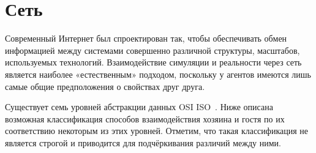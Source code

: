 \section{Сеть}

Современный Интернет был спроектирован так, чтобы обеспечивать обмен информацией между системами совершенно различной структуры, масштабов, используемых технологий. Взаимодействие симуляции и реальности через сеть является наиболее «естественным» подходом, поскольку у агентов имеются лишь самые общие предположения о свойствах друг друга.

Существует семь уровней абстракции данных OSI ISO~\cite{osi-iso-rus}. Ниже описана возможная классификация способов взаимодействия хозяина и гостя по их соответствию некоторым из этих уровней. Отметим, что такая классификация не является строгой и приводится для подчёркивания различий между ними.


